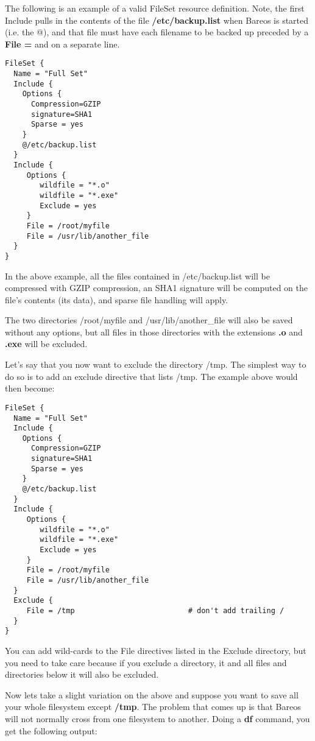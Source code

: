 The following is an example of a valid FileSet resource definition.  Note,
the first Include pulls in the contents of the file {\bf /etc/backup.list}
when Bareos is started (i.e.  the @), and that file must have each filename
to be backed up preceded by a {\bf File =} and on a separate line.

\footnotesize
\begin{verbatim}
FileSet {
  Name = "Full Set"
  Include {
    Options {
      Compression=GZIP
      signature=SHA1
      Sparse = yes
    }
    @/etc/backup.list
  }
  Include {
     Options {
        wildfile = "*.o"
        wildfile = "*.exe"
        Exclude = yes
     }
     File = /root/myfile
     File = /usr/lib/another_file
  }
}
\end{verbatim}
\normalsize

In the above example, all the files contained in /etc/backup.list will
be compressed with GZIP compression, an SHA1 signature will be computed on the
file's contents (its data), and sparse file handling will apply.

The two directories /root/myfile and /usr/lib/another\_file will also be saved
without any options, but all files in those directories with the extensions
{\bf .o} and {\bf .exe} will be excluded.

Let's say that you now want to exclude the directory /tmp. The simplest way
to do so is to add an exclude directive that lists /tmp.  The example
above would then become:

\footnotesize
\begin{verbatim}
FileSet {
  Name = "Full Set"
  Include {
    Options {
      Compression=GZIP
      signature=SHA1
      Sparse = yes
    }
    @/etc/backup.list
  }
  Include {
     Options {
        wildfile = "*.o"
        wildfile = "*.exe"
        Exclude = yes
     }
     File = /root/myfile
     File = /usr/lib/another_file
  }
  Exclude {
     File = /tmp                          # don't add trailing /
  }
}
\end{verbatim}
\normalsize


You can add wild-cards to the File directives listed in the Exclude
directory, but you need to take care because if you exclude a directory,
it and all files and directories below it will also be excluded.

Now lets take a slight variation on the above and suppose
you want to save all your whole filesystem except {\bf /tmp}.
The problem that comes up is that Bareos will not normally
cross from one filesystem to another.
Doing a {\bf df} command, you get the following output:

